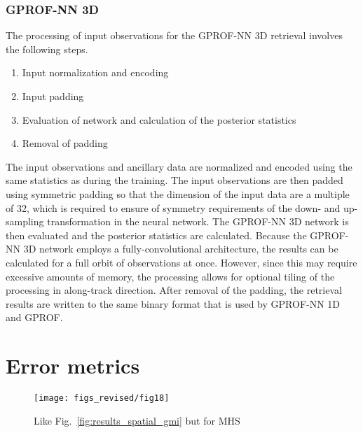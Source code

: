 \documentclass[journal abbreviation, manuscript]{copernicus}
\begin{document}
\subsubsection{GPROF-NN 3D}

The processing of input observations for the GPROF-NN 3D retrieval involves the
following steps.

\begin{enumerate}
\item Input normalization and encoding
\item Input padding
\item Evaluation of network and calculation of the posterior statistics 
\item Removal of padding
\end{enumerate}

The input observations and ancillary data are normalized and encoded using the
same statistics as during the training. The input observations are then padded
using symmetric padding so that the dimension of the input data are a multiple
of 32, which is required to ensure of symmetry requirements of the down- and
up-sampling transformation in the neural network. The GPROF-NN 3D network
is then evaluated and the posterior statistics are calculated. Because the
GPROF-NN 3D network employs a fully-convolutional architecture, the results can
be calculated for a full orbit of observations at once. However, since this may
require excessive amounts of memory, the processing allows for optional tiling
of the processing in along-track direction. After removal of the padding, the
retrieval results are written to the same binary format that is used by GPROF-NN
1D and GPROF.


\section{Error metrics}

\appendixfigures  %

\begin{figure}[hbpt]
  \centering
  \texttt{[image: figs\_revised/fig18]}
  \caption{Like Fig.~\ref{fig:results_spatial_gmi} but for MHS}
  \label{fig:results_spatial_mhs}
\end{figure}

\appendixtables   %
\end{document}
